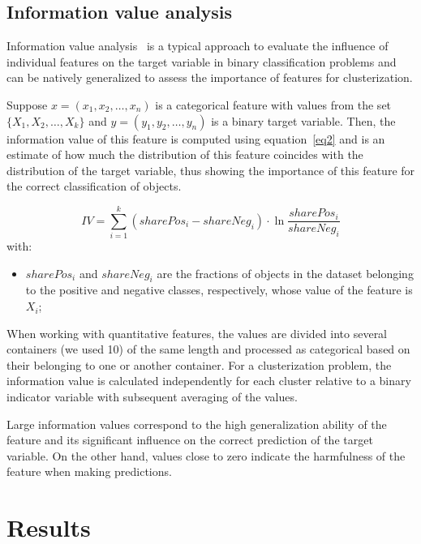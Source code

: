 \documentclass[journal,twoside,web]{ieeecolor2}
\begin{document}
\subsection{Information value analysis}

Information value analysis~\cite{InformationValue} is a typical approach to evaluate the influence of individual features on the target variable in binary classification problems and can be natively generalized to assess the importance of features for clusterization.

Suppose $x=(x_1, x_2, \ldots, x_n)$ is a categorical feature with values from the set $\{ X_1, X_2, \ldots, X_k \}$ and $y=(y_1, y_2, \ldots, y_n)$ is a binary target variable. Then, the information value of this feature is computed using equation~\eqref{eq2} and is an estimate of how much the distribution of this feature coincides with the distribution of the target variable, thus showing the importance of this feature for the correct classification of objects.

\begin{equation}
IV = \sum_{i = 1}^{k} (sharePos_i - shareNeg_i) \cdot \ln \dfrac{sharePos_i}{shareNeg_i} \label{eq2}
\end{equation}
with:
\begin{itemize}
    \item
        $sharePos_i$ and $shareNeg_i$ are the fractions of objects in the dataset belonging to the positive and negative classes, respectively, whose value of the feature is $X_i$;
\end{itemize}

When working with quantitative features, the values are divided into several containers (we used 10) of the same length and processed as categorical based on their belonging to one or another container. For a clusterization problem, the information value is calculated independently for each cluster relative to a binary indicator variable with subsequent averaging of the values.

Large information values correspond to the high generalization ability of the feature and its significant influence on the correct prediction of the target variable. On the other hand, values close to zero indicate the harmfulness of the feature when making predictions.

\section{Results}
\end{document}
